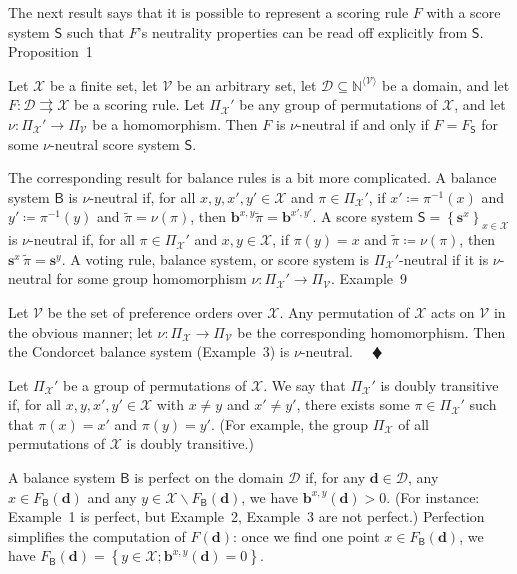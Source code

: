 \documentclass[
]{article}
\begin{document}
The next result says that it is possible to represent a scoring rule
\(F\) with a score system \(\mathsf{S}\) such that \(F\)'s neutrality
properties can be read off explicitly from \(\mathsf{S}\). Proposition~1

Let \(\mathcal{X}\) be a finite set, let \(\mathcal{V}\) be an arbitrary
set, let
\(\mathcal{D} \subseteq \mathbb{N}^{\langle\mathcal{V}\rangle}\) be a
domain, and let
\(\left. F:\mathcal{D}\rightrightarrows\mathcal{X} \right.\) be a
scoring rule. Let \(\Pi_{\mathcal{X}}'\) be any group of permutations of
\(\mathcal{X}\), and let
\(\left. \nu:\Pi_{\mathcal{X}}'\longrightarrow\Pi_{\mathcal{V}} \right.\)
be a homomorphism. Then \(F\) is \(\nu\)-neutral if and only if
\(F = F_{\mathsf{S}}\) for some \(\nu\)-neutral score system
\(\mathsf{S}\).

The corresponding result for balance rules is a bit more complicated. A
balance system \(\mathsf{B}\) is \(\nu\)-neutral if, for all
\(x,y,x',y' \in \mathcal{X}\) and \(\pi \in \Pi_{\mathcal{X}}'\), if
\(x' ≔ \pi^{- 1}(x)\) and \(y' ≔ \pi^{- 1}(y)\) and
\(\widetilde{\pi} = \nu(\pi)\), then
\(\mathbf{b}^{x,y}\widetilde{\pi} = \mathbf{b}^{x',y'}\). A score system
\(\mathsf{S} = \left\{ \mathbf{s}^{x} \right\}_{x \in \mathcal{X}}\) is
\(\nu\)-neutral if, for all \(\pi \in \Pi_{\mathcal{X}}'\) and
\(x,y \in \mathcal{X}\), if \(\pi(y) = x\) and
\(\widetilde{\pi} ≔ \nu(\pi)\), then
\(\mathbf{s}^{x}\,\widetilde{\pi} = \mathbf{s}^{y}\). A voting rule,
balance system, or score system is \(\Pi_{\mathcal{X}}'\)-neutral if it
is \(\nu\)-neutral for some group homomorphism
\(\left. \nu:\Pi_{\mathcal{X}}'\longrightarrow\Pi_{\mathcal{V}} \right.\).
Example~9

Let \(\mathcal{V}\) be the set of preference orders over
\(\mathcal{X}\). Any permutation of \(\mathcal{X}\) acts on
\(\mathcal{V}\) in the obvious manner; let
\(\left. \nu:\Pi_{\mathcal{X}}\longrightarrow\Pi_{\mathcal{V}} \right.\)
be the corresponding homomorphism. Then the Condorcet balance system
(Example~3) is \(\nu\)-neutral. \(\quad ♦\)

Let \(\Pi_{\mathcal{X}}'\) be a group of permutations of
\(\mathcal{X}\). We say that \(\Pi_{\mathcal{X}}'\) is doubly transitive
if, for all \(x,y,x',y' \in \mathcal{X}\) with \(x \neq y\) and
\(x' \neq y'\), there exists some \(\pi \in \Pi_{\mathcal{X}}'\) such
that \(\pi(x) = x'\) and \(\pi(y) = y'\). (For example, the group
\(\Pi_{\mathcal{X}}\) of all permutations of \(\mathcal{X}\) is doubly
transitive.)

A balance system \(\mathsf{B}\) is perfect on the domain \(\mathcal{D}\)
if, for any \(\mathbf{d} \in \mathcal{D}\), any
\(x \in F_{\mathsf{B}}\left( \mathbf{d} \right)\) and any
\(y \in \mathcal{X} \smallsetminus F_{\mathsf{B}}\left( \mathbf{d} \right)\),
we have \(\mathbf{b}^{x,y}\left( \mathbf{d} \right) > 0\). (For
instance: Example~1 is perfect, but Example~2, Example~3 are not
perfect.) Perfection simplifies the computation of
\(F\left( \mathbf{d} \right)\): once we find one point
\(x \in F_{\mathsf{B}}\left( \mathbf{d} \right)\), we have
\(F_{\mathsf{B}}\left( \mathbf{d} \right) = \left\{ y \in \mathcal{X};\mathbf{b}^{x,y}\left( \mathbf{d} \right) = 0 \right\}\).
\end{document}
